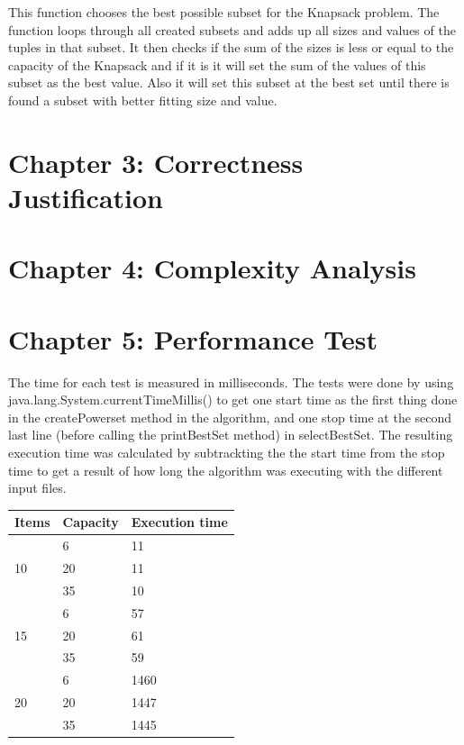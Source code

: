 \documentclass{article}
\begin{document}
\noindent This function chooses the best possible subset for the Knapsack problem. The function loops through all created subsets and adds up all sizes and values of the tuples in that subset. It then checks if the sum of the sizes is less or equal to the capacity of the Knapsack and if it is it will set the sum of the values of this subset as the best value. Also it will set this subset at the best set until there is found a subset with better fitting size and value.\\


\section*{Chapter 3: Correctness Justification}

\section*{Chapter 4: Complexity Analysis}

\section*{Chapter 5: Performance Test}

The time for each test is measured in milliseconds. The tests were done by using java.lang.System.currentTimeMillis() to get one start time as the first thing done in the createPowerset method in the algorithm, and one stop time at the second last line (before calling the printBestSet method) in selectBestSet. The resulting execution time was calculated by subtrackting the the start time from the stop time to get a result of how long the algorithm was executing with the different input files.\\

\begin{tabular}{|l|l|l|} \hline
Items &Capacity &Execution time\\ \hline
\multirow{3}{*}{10} & 6 & 11 \\
& 20 & 11 \\
& 35 & 10 \\ \hline
\multirow{3}{*}{15} & 6 & 57 \\
& 20 & 61 \\
& 35 & 59 \\ \hline
\multirow{3}{*}{20} & 6 & 1460 \\
& 20 & 1447 \\
& 35 & 1445 \\ \hline
\end{tabular}
\end{document}
